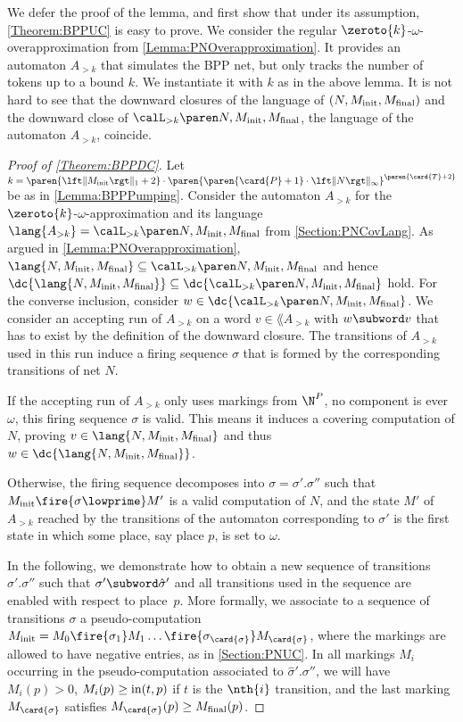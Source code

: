 \documentclass[../../diss.tex]{subfiles}
\begin{document}
We defer the proof of the lemma, and first show that under its assumption, \cref{Theorem:BPPUC} is easy to prove.
We consider the regular $\zeroto{k}$-$\omega$-overapproximation from \cref{Lemma:PNOverapproximation}.
It provides an automaton $A_{> k}$ that simulates the BPP net, but only tracks the number of tokens up to a bound $k$.
We instantiate it with $k$ as in the above lemma.
It is not hard to see that the downward closures of the language of $(N,M_{\text{init}},M_{\text{final}})$ and the downward close of $\langoak{k}{N,\Minit,\Mfinal}$, the language of the automaton $A_{> k}$, coincide.

\begin{proof}[Proof of \cref{Theorem:BPPDC}]
    Let $k = \paren{\normone{\Minit}+2} \cdot \paren{ \paren{\card{P}+1} \cdot \norminf{N}}^{ \paren{\card{T} + 2} }$ be as in \cref{Lemma:BPPPumping}.
    Consider the automaton $A_{> k}$ for the $\zeroto{k}$-$\omega$-approximation and its language $\lang{A_{>k}} = \langoak{k}{N,\Minit,\Mfinal}$ from \cref{Section:PNCovLang}.
    As argued in \cref{Lemma:PNOverapproximation}, $\lang{N,\Minit,\Mfinal} \subseteq \langoak{k}{N,\Minit,\Mfinal}$ and hence $\dc{\lang{N,\Minit,\Mfinal}} \subseteq \dc{\langoak{k}{N,\Minit,\Mfinal}}$ hold.
    For the converse inclusion, consider $w \in \dc{\langoak{k}{N,\Minit,\Mfinal}}$.
    We consider an accepting run of $A_{> k}$ on a word $v \in \lang{A_{> k}}$ with $w \subword v$ that has to exist by the definition of the downward closure.
    The transitions of $A_{> k}$ used in this run induce a firing sequence $\sigma$ that is formed by the corresponding transitions of net $N$.

    If the accepting run of $A_{> k}$ only uses markings from $\N^P$, \ie no component is ever $\omega$, this firing sequence $\sigma$ is valid.
    This means it induces a covering computation of $N$, proving $v \in \lang{N,\Minit,\Mfinal}$ and thus $w \in \dc{\lang{N,\Minit,\Mfinal}}$.

    Otherwise, the firing sequence decomposes into $\sigma = \sigma'.\sigma''$ such that $\Minit \fire{\sigma\lowprime} M'$ is a valid computation of $N$, and the state $M'$ of $A_{> k}$ reached by the transitions of the automaton corresponding to $\sigma'$ is the first state in which some place, say place $p$, is set to $\omega$.

    In the following, we demonstrate how to obtain a new sequence of transitions $\hat{\sigma}'.\sigma''$ such that $\sigma' \subword \hat{\sigma}'$ and all transitions used in the sequence are enabled with respect to place~$p$.
    More formally, we associate to a sequence of transitions $\sigma$ a pseudo-computation $\Minit = M_0 \fire{\sigma_1} M_1 \ldots \fire{\sigma_{\card{\sigma}}} M_{\card{\sigma}}$, where the markings are allowed to have negative entries, as in \cref{Section:PNUC}.
    In all markings $M_i$ occurring in the pseudo-computation associated to $\hat{\sigma}'.\sigma''$, we will have $M_i(p) > 0$, $M_i(p) \geq \text{in}(t,p)$ if $t$ is the $\nth{i}$ transition, and the last marking $M_{\card{\sigma}}$ satisfies $M_{\card{\sigma}}(p) \geq \Mfinal(p)$.


\end{proof}
\end{document}
